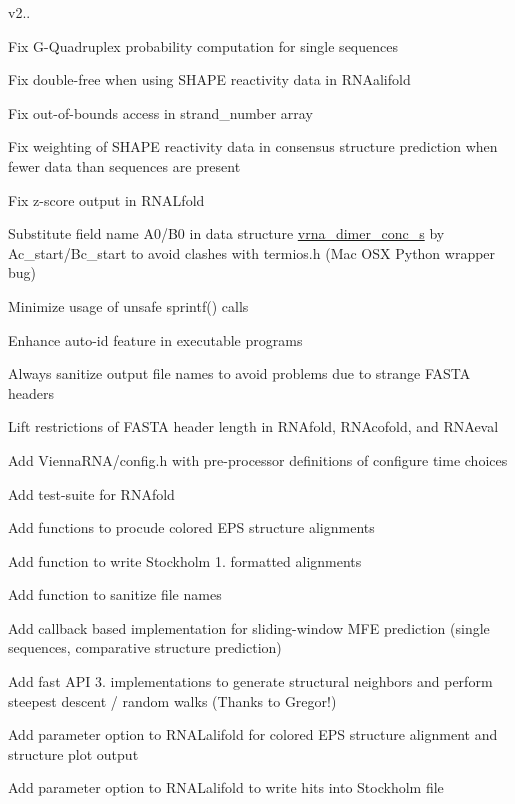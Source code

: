 v2..
\begin{DoxyItemize}
\item Fix G-\/\+Quadruplex probability computation for single sequences
\item Fix double-\/free when using S\+H\+A\+PE reactivity data in R\+N\+Aalifold
\item Fix out-\/of-\/bounds access in strand\+\_\+number array
\item Fix weighting of S\+H\+A\+PE reactivity data in consensus structure prediction when fewer data than sequences are present
\item Fix z-\/score output in R\+N\+A\+Lfold
\item Substitute field name \textquotesingle{}A0\textquotesingle{}/\textquotesingle{}B0\textquotesingle{} in data structure \mbox{\hyperlink{structvrna__dimer__conc__s}{vrna\+\_\+dimer\+\_\+conc\+\_\+s}} by \textquotesingle{}Ac\+\_\+start\textquotesingle{}/\textquotesingle{}Bc\+\_\+start\textquotesingle{} to avoid clashes with termios.\+h (Mac O\+SX Python wrapper bug)
\item Minimize usage of \textquotesingle{}unsafe\textquotesingle{} sprintf() calls
\item Enhance auto-\/id feature in executable programs
\item Always sanitize output file names to avoid problems due to strange F\+A\+S\+TA headers
\item Lift restrictions of F\+A\+S\+TA header length in R\+N\+Afold, R\+N\+Acofold, and R\+N\+Aeval
\item Add Vienna\+R\+N\+A/config.\+h with pre-\/processor definitions of configure time choices
\item Add test-\/suite for R\+N\+Afold
\item Add functions to procude colored E\+PS structure alignments
\item Add function to write Stockholm 1. formatted alignments
\item Add function to sanitize file names
\item Add callback based implementation for sliding-\/window M\+FE prediction (single sequences, comparative structure prediction)
\item Add fast A\+PI 3. implementations to generate structural neighbors and perform steepest descent / random walks (Thanks to Gregor!)
\item Add parameter option to R\+N\+A\+Lalifold for colored E\+PS structure alignment and structure plot output
\item Add parameter option to R\+N\+A\+Lalifold to write hits into Stockholm file

\end{DoxyItemize}
